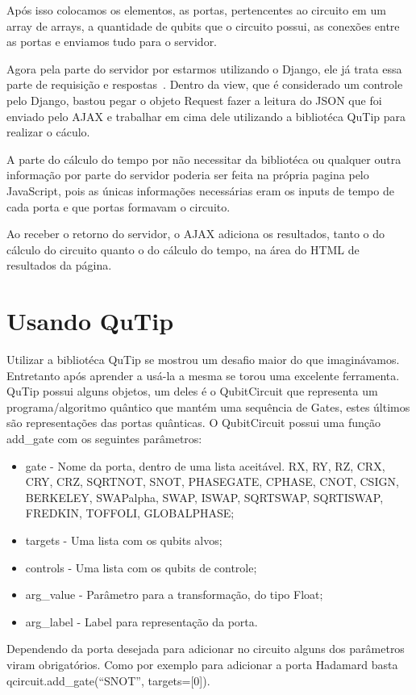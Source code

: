 \documentclass[a4paper, 12pt, oneside]{book}
\begin{document}
Após isso colocamos os elementos, as portas, pertencentes ao circuito em um array de arrays, a quantidade de qubits que o circuito possui, as conexões entre as portas e enviamos tudo para o servidor.

Agora pela parte do servidor por estarmos utilizando o Django, ele já trata essa parte de requisição e respostas~\cite{django-req-resp}. Dentro da view, que é considerado um controle pelo Django, bastou pegar o objeto Request fazer a leitura do JSON que foi enviado pelo AJAX e trabalhar em cima dele utilizando a bibliotéca QuTip para realizar o cáculo.

A parte do cálculo do tempo por não necessitar da bibliotéca ou qualquer outra informação por parte do servidor poderia ser feita na própria pagina pelo JavaScript, pois as únicas informações necessárias eram os inputs de tempo de cada porta e que portas formavam o circuito.

Ao receber o retorno do servidor, o AJAX adiciona os resultados, tanto o do cálculo do circuito quanto o do cálculo do tempo, na área do HTML de resultados da página.

\section{Usando QuTip}

Utilizar a bibliotéca QuTip se mostrou um desafio maior do que imaginávamos. Entretanto após aprender a usá-la a mesma se torou uma excelente ferramenta. QuTip possui alguns objetos, um deles é o QubitCircuit que representa um programa/algoritmo quântico que mantém uma sequência de Gates, estes últimos são representações das portas quânticas. O QubitCircuit possui uma função add\_gate com os seguintes parâmetros:
\begin{itemize}
\item gate - Nome da porta, dentro de uma lista aceitável. RX, RY, RZ, CRX, CRY, CRZ, SQRTNOT, SNOT, PHASEGATE, CPHASE, CNOT, CSIGN, BERKELEY, SWAPalpha, SWAP, ISWAP, SQRTSWAP, SQRTISWAP, FREDKIN, TOFFOLI, GLOBALPHASE;
\item targets - Uma lista com os qubits alvos;
\item controls - Uma lista com os qubits de controle;
\item arg\_value - Parâmetro para a transformação, do tipo Float;
\item arg\_label - Label para representação da porta.
\end{itemize}
Dependendo da porta desejada para adicionar no circuito alguns dos parâmetros viram obrigatórios. Como por exemplo para adicionar a porta Hadamard basta qcircuit.add\_gate(``SNOT'', targets=[0]).
\end{document}
